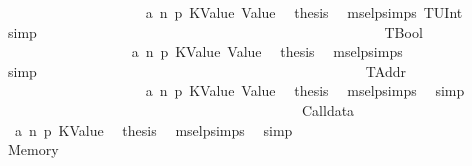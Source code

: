 \begin{isabellebody}
\ \ \ \ \ \ \ \ \ \ \ \ \ \ \ \ \ \ \isamarkupfalse%
\ {}\ a{}\ n\ p{}\ KValue\ Value\ \isamarkupfalse%
\ {\isacharquery}{\kern0pt}thesis\ \isamarkupfalse%
\ msel{\isachardot}{\kern0pt}psimps{\isacharparenleft}{\kern0pt}{}{\isacharparenright}{\kern0pt}\ TUInt\ \isamarkupfalse%
\ simp\isanewline
\ \ \ \ \ \ \ \ \ \ \ \ \ \ \ \ \isamarkupfalse%
\isanewline
\ \ \ \ \ \ \ \ \ \ \ \ \ \ \isamarkupfalse%
\isanewline
\ \ \ \ \ \ \ \ \ \ \ \ \ \ \ \ \isamarkupfalse%
\ TBool\isanewline
\ \ \ \ \ \ \ \ \ \ \ \ \ \ \ \ \isamarkupfalse%
\ {}\ a{}\ n\ p{}\ KValue\ Value\ \isamarkupfalse%
\ {\isacharquery}{\kern0pt}thesis\ \isamarkupfalse%
\ msel{\isachardot}{\kern0pt}psimps{\isacharparenleft}{\kern0pt}{}{\isacharparenright}{\kern0pt}\ \isamarkupfalse%
\ simp\ \ \ \ \ \ \ \ \ \ \ \ \ \ \isanewline
\ \ \ \ \ \ \ \ \ \ \ \ \ \ \isamarkupfalse%
\isanewline
\ \ \ \ \ \ \ \ \ \ \ \ \ \ \ \ \isamarkupfalse%
\ TAddr\isanewline
\ \ \ \ \ \ \ \ \ \ \ \ \ \ \ \ \ \ \isamarkupfalse%
\ {}\ a{}\ n\ p{}\ KValue\ Value\ \isamarkupfalse%
\ {\isacharquery}{\kern0pt}thesis\ \isamarkupfalse%
\ msel{\isachardot}{\kern0pt}psimps{\isacharparenleft}{\kern0pt}{}{\isacharparenright}{\kern0pt}\ \isamarkupfalse%
\ simp\isanewline
\ \ \ \ \ \ \ \ \ \ \ \ \ \ \isamarkupfalse%
\isanewline
\ \ \ \ \ \ \ \ \ \ \ \ \isamarkupfalse%
\isanewline
\ \ \ \ \ \ \ \ \ \ \ \ \ \ \isamarkupfalse%
\ {\isacharparenleft}{\kern0pt}Calldata\ {\isacharunderscore}{\kern0pt}{\isacharparenright}{\kern0pt}\isanewline
\ \ \ \ \ \ \ \ \ \ \ \ \ \ \isamarkupfalse%
\ {}\ a{}\ n\ p{}\ KValue\ \isamarkupfalse%
\ {\isacharquery}{\kern0pt}thesis\ \isamarkupfalse%
\ msel{\isachardot}{\kern0pt}psimps{\isacharparenleft}{\kern0pt}{}{\isacharparenright}{\kern0pt}\ \isamarkupfalse%
\ simp\isanewline
\ \ \ \ \ \ \ \ \ \ \ \ \isamarkupfalse%
\isanewline
\ \ \ \ \ \ \ \ \ \ \ \ \ \ \isamarkupfalse%
\ {\isacharparenleft}{\kern0pt}Memory\ {\isacharunderscore}{\kern0pt}{\isacharparenright}{\kern0pt}\isanewline
\ \ \ \ \ \ \ \ \ \ \ \ \ \ \isamarkupfalse%

\end{isabellebody}
